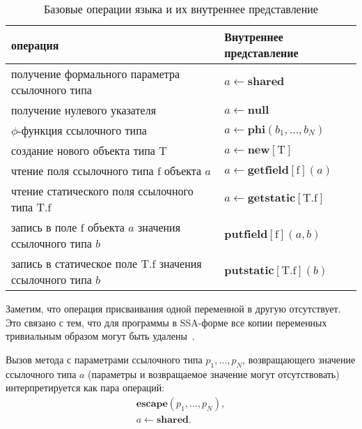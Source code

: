 \documentclass[14pt,titlepage,draft]{extarticle}
\newcommand{\java}{\eng{Java}\xspace}
\let\mathphi\phi
\renewcommand{\phi}{\ensuremath{\mathphi}}
\newcommand{\type}[1]{\mathrm{#1}}
\newcommand{\field}[1]{\mathrm{#1}}
\newcommand{\sfield}[2]{\type{#1}.\field{#2}}
\newcommand{\op}[1]{\mathbf{#1}}
\begin{document}
    \begin{table}[htb]
      \centering

      \begin{tabular}{|p{}|p{}|}\hline
        \textbf{\java операция} &
          \textbf{Внутреннее представление}\\ \hline

        получение формального параметра ссылочного типа
        & $a \gets \op{shared}$
        \\ \hline

        получение нулевого указателя
        & $a \gets \op{null}$
        \\ \hline

        \phi-функция ссылочного типа
        & $a \gets \op{phi}(b_1, \ldots, b_N)$
        \\ \hline

        создание нового объекта типа $\type{T}$
        & $a \gets \op{new}[\type{T}]$
        \\ \hline

        чтение поля ссылочного типа $\field{f}$ объекта $a$
        & $a \gets \op{getfield}[\field{f}](a)$
        \\ \hline

        чтение статического поля ссылочного типа $\sfield{T}{f}$
        & $a \gets \op{getstatic}[\sfield{T}{f}]$
        \\ \hline

        запись в поле $\field{f}$ объекта $a$ значения ссылочного типа $b$
        & $\op{putfield}[\field{f}](a, b)$
        \\ \hline

        запись в статическое поле $\sfield{T}{f}$ значения ссылочного типа $b$
        & $\op{putstatic}[\sfield{T}{f}](b)$
        \\ \hline

      \end{tabular}
      \caption{Базовые операции языка \java и их внутреннее представление}
      \label{tabular:basic_operations}
    \end{table}

    Заметим, что операция присваивания одной переменной в другую отсутствует.
    Это связано с тем, что для программы в SSA-форме все копии переменных
    тривиальным образом могут быть удалены~\cite{ssa}.

    Вызов метода с параметрами ссылочного типа $p_1, \ldots, p_N$, возвращающего
    значение ссылочного типа $a$ (параметры и возвращаемое значение могут
    отсутствовать) интерпретируется как пара операций:
    \begin{gather*}
      \op{escape}(p_1, \ldots, p_N), \\
      a \gets \op{shared}.
    \end{gather*}
\end{document}
